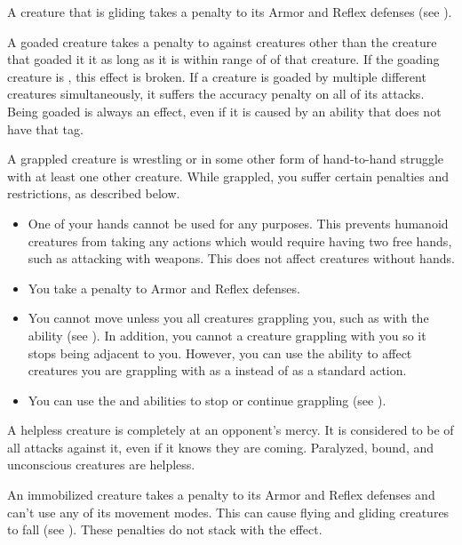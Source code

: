    A creature that is gliding takes a  penalty to its Armor and Reflex defenses (see ).

   A goaded creature takes a  penalty to  against creatures other than the creature that goaded it it as long as it is within \rngmed range of of that creature.
  If the goading creature is , this effect is broken.
  If a creature is goaded by multiple different creatures simultaneously, it suffers the accuracy penalty on all of its attacks.
  Being goaded is always an  effect, even if it is caused by an ability that does not have that tag.

   A grappled creature is wrestling or in some other form of hand-to-hand struggle with at least one other creature.
  While grappled, you suffer certain penalties and restrictions, as described below.
  \begin{itemize}
    \item One of your hands cannot be used for any purposes.
      This prevents humanoid creatures from taking any actions which would require having two free hands, such as attacking with  weapons.
      This does not affect creatures without hands.
    \item You take a  penalty to Armor and Reflex defenses.
    \item You cannot move unless you  all creatures grappling you, such as with the  ability (see ).
      In addition, you cannot  a creature grappling with you so it stops being adjacent to you.
      However, you can use the  ability to affect creatures you are grappling with as a  instead of as a standard action.
    \item You can use the  and  abilities to stop or continue grappling (see ).
  \end{itemize}

   A helpless creature is completely at an opponent's mercy.
  It is considered to be \unaware of all attacks against it, even if it knows they are coming.
  Paralyzed, bound, and unconscious creatures are helpless.

   An immobilized creature takes a  penalty to its Armor and Reflex defenses and can't use any of its movement modes.
  This can cause flying and gliding creatures to fall (see ).
  These penalties do not stack with the \slowed effect.


